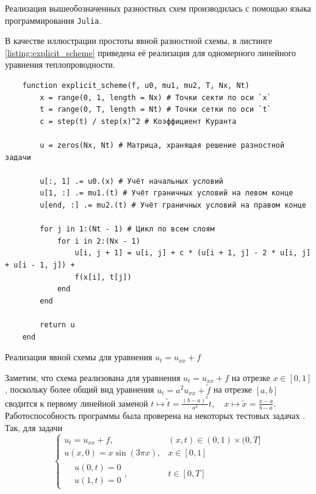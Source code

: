 
Реализация вышеобозначенных разностных схем производилась с помощью языка программирования \texttt{Julia}\cite{bezanson2017julia}. 

В качестве иллюстрации простоты явной разностной схемы, в листинге \ref{listing:explicit_scheme} приведена её реализация для одномерного линейного уравнения теплопроводности.
\begin{listing}
    \begin{verbatim}
    function explicit_scheme(f, u0, mu1, mu2, T, Nx, Nt)
        x = range(0, 1, length = Nx) # Точки секти по оси `x`
        t = range(0, T, length = Nt) # Точки сетки по оси `t`
        c = step(t) / step(x)^2 # Коэффициент Куранта
    
        u = zeros(Nx, Nt) # Матрица, хранящая решение разностной задачи
    
        u[:, 1] .= u0.(x) # Учёт начальных условий
        u[1, :] .= mu1.(t) # Учёт граничных условий на левом конце
        u[end, :] .= mu2.(t) # Учёт граничных условий на правом конце
    
        for j in 1:(Nt - 1) # Цикл по всем слоям
            for i in 2:(Nx - 1)
                u[i, j + 1] = u[i, j] + c * (u[i + 1, j] - 2 * u[i, j] + u[i - 1, j]) + 
                f(x[i], t[j])
            end
        end
    
        return u
    end
    \end{verbatim}
    \caption{Реализация явной схемы для уравнения $u_t = u_{xx} + f$}
    \label{listing:explicit_scheme}
\end{listing}
Заметим, что схема реализована для уравнения $u_t = u_{xx} + f$ на отрезке $x \in [0, 1]$, поскольку более общий вид уравнения $u_t = a^2 u_{xx} + \tilde{f}$ на отрезке $[a, b]$ сводится к первому линейной заменой $ t \mapsto \tilde{t} = \frac{(b - a)^2}{a^2} t, \quad x \mapsto \tilde{x} = \frac{x - a}{b - a}$.
Работоспособность программы была проверена на некоторых тестовых задачах \cite{горюнов2015методы}.
Так, для задачи
\begin{equation}\label{eq:task_1}
    \begin{cases}
        u_t = u_{xx} + f, & (x, t) \in (0, 1) \times (0, T]\\
        u(x, 0) = x\sin (3\pi x), & x \in [0, 1]\\
        \begin{aligned}
            & \textstyle u(0, t) = 0\\
            & \textstyle u(1, t) = 0
        \end{aligned}, & t \in [0, T]
    \end{cases}
\end{equation}

